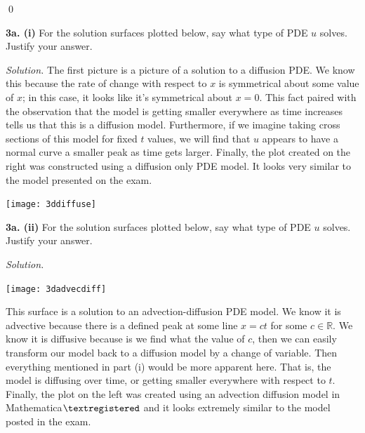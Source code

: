 \documentclass{article}
\begin{document}
\begin{flushright}
\qed
\end{flushright}
\newpage
\textbf{3a. (i)} For the solution surfaces plotted below, say what type of PDE \(u\) solves. Justify your answer. 

\vspace{0mm}



\begin{multicols}{2}
\textit{Solution.} The first picture is a picture of a solution to a diffusion PDE. We know this because the rate of change with respect to \(x\) is symmetrical about some value of \(x\); in this case, it looks like it's symmetrical about \(x=0\). This fact paired with the observation that the model is getting smaller everywhere as time increases tells us that this is a diffusion model. Furthermore, if we imagine taking cross sections of this model for fixed \(t\) values, we will find that \(u\) appears to have a normal curve a smaller peak as time gets larger.  Finally, the plot created on the right was constructed using a diffusion only PDE model. It looks very similar to the model presented on the exam. 

\begin{flushright}
\texttt{[image: 3ddiffuse]}
\end{flushright}
\end{multicols}


  

\vspace{3mm}
\textbf{3a. (ii)} For the solution surfaces plotted below, say what type of PDE \(u\) solves. Justify your answer. 

\begin{multicols}{2}
\textit{Solution.} \begin{flushleft}
\texttt{[image: 3dadvecdiff]}
\end{flushleft}

This surface is a solution to an advection-diffusion PDE model. We know it is advective because there is a defined peak at some line \(x=ct\) for some \( c\in \mathbb{R}\). We know it is diffusive because is we find what the value of \(c\), then we can easily transform our model back to a diffusion model by a change of variable. Then everything mentioned in part (i) would be more apparent here. That is, the model is diffusing over time, or getting smaller everywhere with respect to \(t\). Finally, the plot on the left was created using an advection diffusion model in Mathematica\( \textregistered\) and it looks extremely similar to the model posted in the exam.  
\end{multicols}
\end{document}

